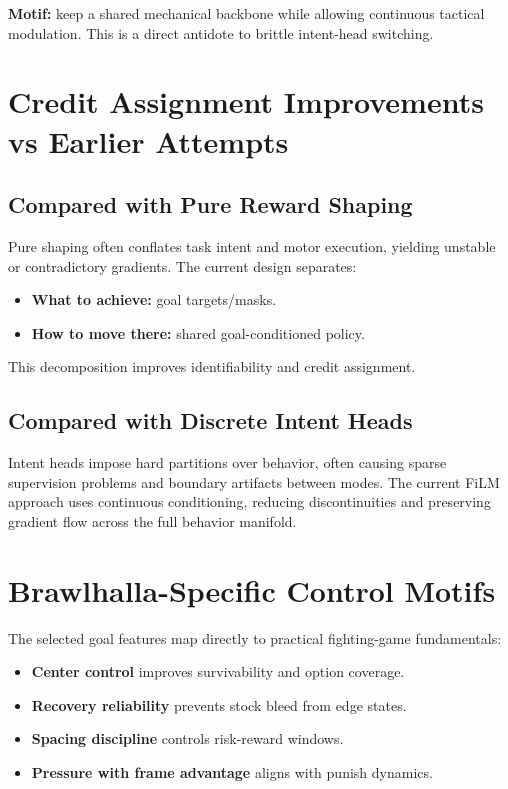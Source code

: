 \documentclass[11pt,a4paper]{article}
\begin{document}
\textbf{Motif:} keep a shared mechanical backbone while allowing continuous tactical modulation. This is a direct antidote to brittle intent-head switching.

\section{Credit Assignment Improvements vs Earlier Attempts}
\subsection{Compared with Pure Reward Shaping}
Pure shaping often conflates task intent and motor execution, yielding unstable or contradictory gradients. The current design separates:
\begin{itemize}[leftmargin=1.5em]
    \item \textbf{What to achieve:} goal targets/masks.
    \item \textbf{How to move there:} shared goal-conditioned policy.
\end{itemize}
This decomposition improves identifiability and credit assignment.

\subsection{Compared with Discrete Intent Heads}
Intent heads impose hard partitions over behavior, often causing sparse supervision problems and boundary artifacts between modes. The current FiLM approach uses continuous conditioning, reducing discontinuities and preserving gradient flow across the full behavior manifold.

\section{Brawlhalla-Specific Control Motifs}
The selected goal features map directly to practical fighting-game fundamentals:
\begin{itemize}[leftmargin=1.5em]
    \item \textbf{Center control} improves survivability and option coverage.
    \item \textbf{Recovery reliability} prevents stock bleed from edge states.
    \item \textbf{Spacing discipline} controls risk-reward windows.
    \item \textbf{Pressure with frame advantage} aligns with punish dynamics.
\end{itemize}
\end{document}
